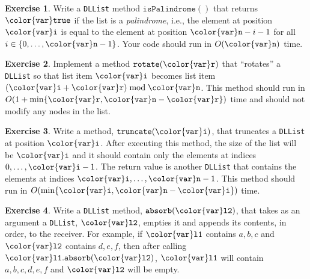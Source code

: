 \documentclass[10pt]{book}
\theoremstyle{plain}
\theoremstyle{definition}
\newtheorem{exc}{Exercise}[chapter]
\newcommand{\exclabel}[1]{\label{exc:#1}}
\begin{document}
\begin{exc}
  Write a \texttt{DLList} method \ensuremath{\mathtt{isPalindrome()}} that returns \ensuremath{\mathtt{{\color{var}true}}} if the
  list is a \emph{palindrome},
  i.e., the element at position \ensuremath{\mathtt{{\color{var}i}}} is equal to
  the element at position $\ensuremath{\mathtt{{\color{var}n}}}-i-1$ for all $i\in\{0,\ldots,\ensuremath{\mathtt{{\color{var}n}}}-1\}$.
  Your code should run in $O(\ensuremath{\mathtt{{\color{var}n}}})$ time.
\end{exc}

\begin{exc}
  Implement a method \ensuremath{\mathtt{rotate({\color{var}r})}} that ``rotates'' a \texttt{DLList} so that list
  item \ensuremath{\mathtt{{\color{var}i}}} becomes list item $(\ensuremath{\mathtt{{\color{var}i}}}+\ensuremath{\mathtt{{\color{var}r}}})\bmod \ensuremath{\mathtt{{\color{var}n}}}$.  This method should
  run in $O(1+\min\{\ensuremath{\mathtt{{\color{var}r}}},\ensuremath{\mathtt{{\color{var}n}}}-\ensuremath{\mathtt{{\color{var}r}}}\})$ time and should not modify any nodes in
  the list.
\end{exc}


\begin{exc}\exclabel{linkedlist-truncate}
  Write a method, \ensuremath{\mathtt{truncate({\color{var}i})}}, that truncates a \texttt{DLList} at position
  \ensuremath{\mathtt{{\color{var}i}}}.  After executing this method, the size of the list will be \ensuremath{\mathtt{{\color{var}i}}} and
  it should contain only the elements at indices $0,\ldots,\ensuremath{\mathtt{{\color{var}i}}}-1$.  The
  return value is another \texttt{DLList} that contains the elements at indices
  $\ensuremath{\mathtt{{\color{var}i}}},\ldots,\ensuremath{\mathtt{{\color{var}n}}}-1$.  This method should run in $O(\min\{\ensuremath{\mathtt{{\color{var}i}}},\ensuremath{\mathtt{{\color{var}n}}}-\ensuremath{\mathtt{{\color{var}i}}}\})$
  time.
\end{exc}

\begin{exc}
  Write a \texttt{DLList} method, \ensuremath{\mathtt{absorb({\color{var}l2})}}, that takes as an argument
  a \texttt{DLList}, \ensuremath{\mathtt{{\color{var}l2}}}, empties it and appends its contents, in order,
  to the receiver.  For example, if \ensuremath{\mathtt{{\color{var}l1}}} contains $a,b,c$ and \ensuremath{\mathtt{{\color{var}l2}}}
  contains $d,e,f$, then after calling \ensuremath{\mathtt{{\color{var}l1}.absorb({\color{var}l2})}}, \ensuremath{\mathtt{{\color{var}l1}}} will contain
  $a,b,c,d,e,f$ and \ensuremath{\mathtt{{\color{var}l2}}} will be empty.
\end{exc}
\end{document}
